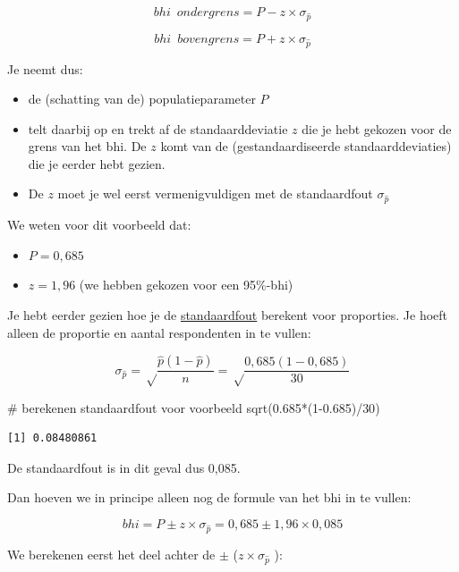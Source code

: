 \documentclass[
  letterpaper,
  DIV=11,
  numbers=noendperiod]{scrreprt}
\newenvironment{Shaded}{\begin{snugshade}}{\end{snugshade}}
\newcommand{\CommentTok}[1]{\textcolor[rgb]{0.37,0.37,0.37}{#1}}
\newcommand{\DecValTok}[1]{\textcolor[rgb]{0.68,0.00,0.00}{#1}}
\newcommand{\FloatTok}[1]{\textcolor[rgb]{0.68,0.00,0.00}{#1}}
\newcommand{\FunctionTok}[1]{\textcolor[rgb]{0.28,0.35,0.67}{#1}}
\newcommand{\NormalTok}[1]{\textcolor[rgb]{0.00,0.23,0.31}{#1}}
\newcommand{\SpecialCharTok}[1]{\textcolor[rgb]{0.37,0.37,0.37}{#1}}
\providecommand{\tightlist}{%
  \setlength{\itemsep}{0pt}\setlength{\parskip}{0pt}}
\begin{document}
\[bhi \enspace ondergrens = P - z\times\sigma_{\hat{p}}\]

\[bhi \enspace bovengrens = P + z\times\sigma_{\hat{p}}\]

Je neemt dus:

\begin{itemize}
\tightlist
\item
  de (schatting van de) populatieparameter \(P\)
\item
  telt daarbij op en trekt af de standaarddeviatie \(z\) die je hebt
  gekozen voor de grens van het bhi. De \(z\) komt van de
  (gestandaardiseerde standaarddeviaties) die je eerder hebt gezien.
\item
  De \(z\) moet je wel eerst vermenigvuldigen met de standaardfout
  \(\sigma_{\hat{p}}\)
\end{itemize}

We weten voor dit voorbeeld dat:

\begin{itemize}
\item
  \(P=0,685\)
\item
  \(z=1,96\) (we hebben gekozen voor een 95\%-bhi)
\end{itemize}

Je hebt eerder gezien hoe je de
\hyperref[sec-standaardfout]{standaardfout} berekent voor proporties. Je
hoeft alleen de proportie en aantal respondenten in te vullen:

\[\sigma_{\hat{p}}=\sqrt\frac{\hat{p}(1-\hat{p})}{n}=\sqrt\frac{0,685(1-0,685)}{30}\]

\begin{Shaded}
\begin{Highlighting}[]
\CommentTok{\# berekenen standaardfout voor voorbeeld}
\FunctionTok{sqrt}\NormalTok{(}\FloatTok{0.685}\SpecialCharTok{*}\NormalTok{(}\DecValTok{1}\FloatTok{{-}0.685}\NormalTok{)}\SpecialCharTok{/}\DecValTok{30}\NormalTok{)}
\end{Highlighting}
\end{Shaded}

\begin{verbatim}
[1] 0.08480861
\end{verbatim}

De standaardfout is in dit geval dus 0,085.

Dan hoeven we in principe alleen nog de formule van het bhi in te
vullen:

\[
bhi = P \pm z\times\sigma_{\hat{p}} = 0,685 \pm 1,96\times0,085
\]

We berekenen eerst het deel achter de \(\pm\)
(\(z\times\sigma_{\hat{p}}\) ):
\end{document}
